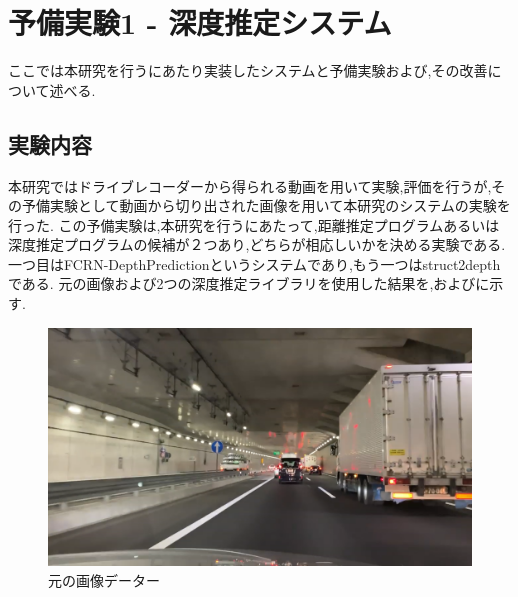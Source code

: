 \newpage
\section{予備実験1 - 深度推定システム}
ここでは本研究を行うにあたり実装したシステムと予備実験および,その改善について述べる.
\subsection{実験内容}
本研究ではドライブレコーダーから得られる動画を用いて実験,評価を行うが,その予備実験として動画から切り出された画像を用いて本研究のシステムの実験を行った.
この予備実験は,本研究を行うにあたって,距離推定プログラムあるいは深度推定プログラムの候補が２つあり,どちらが相応しいかを決める実験である.
一つ目はFCRN-DepthPrediction\cite{laina2016deeper}というシステムであり,もう一つはstruct2depth\cite{casser2019struct2depth}である.
元の画像および2つの深度推定ライブラリを使用した結果を,およびに示す.


\begin{figure}[htbp]
  \begin{center}
    \includegraphics[width=12cm]{figs/depth_raw.png}
   \end{center}
   \caption{元の画像データー}
   \label{fig:depth_raw}
  \end{figure}

